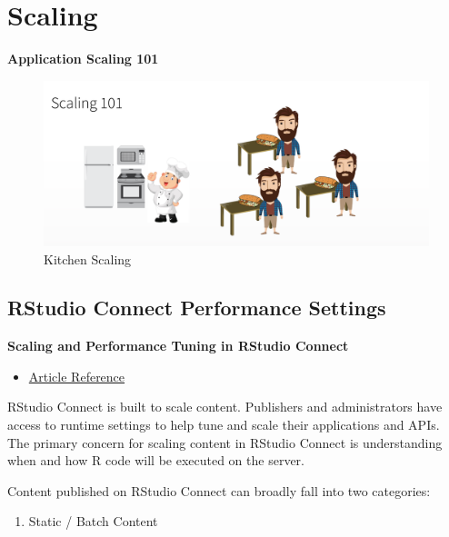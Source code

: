 \documentclass[]{book}
\providecommand{\tightlist}{%
  \setlength{\itemsep}{0pt}\setlength{\parskip}{0pt}}
\theoremstyle{definition}
\theoremstyle{definition}
\theoremstyle{definition}
\theoremstyle{remark}
\begin{document}
\hypertarget{scaling}{%
\chapter{Scaling}\label{scaling}}

\textbf{Application Scaling 101}

\begin{figure}
\centering
\includegraphics{imgs/scaling/kitchen-scaling.png}
\caption{Kitchen Scaling}
\end{figure}

\hypertarget{rstudio-connect-performance-settings}{%
\section{RStudio Connect Performance
Settings}\label{rstudio-connect-performance-settings}}

\textbf{Scaling and Performance Tuning in RStudio Connect}

\begin{itemize}
\tightlist
\item
  \href{https://support.rstudio.com/hc/en-us/articles/231874748-scaling-and-performance-tuning-rstudio-connect}{Article
  Reference}
\end{itemize}

RStudio Connect is built to scale content. Publishers and administrators
have access to runtime settings to help tune and scale their
applications and APIs. The primary concern for scaling content in
RStudio Connect is understanding when and how R code will be executed on
the server.

Content published on RStudio Connect can broadly fall into two
categories:

\begin{enumerate}
\def\labelenumi{\arabic{enumi}.}
\tightlist
\item
  Static / Batch Content
\end{enumerate}
\end{document}
